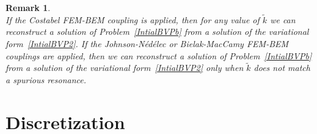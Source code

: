 \documentclass[a4paper,11pt]{article}
\newtheorem{rem}[defn]{Remark}
\begin{document}
\begin{rem}\quad\\
  If the Costabel FEM-BEM coupling is applied, then for any value of
  $\tilde{k}$ we can reconstruct a solution of Problem~\eqref{IntialBVPb}
  from a solution of the variational form~\eqref{IntialBVP2}.  If the
  Johnson-Nédélec or Bielak-MacCamy FEM-BEM couplings are applied, then we
  can reconstruct a solution of Problem~\eqref{IntialBVPb} from a solution
  of the variational form~\eqref{IntialBVP2} only when \(\tilde{k}\) does
  not match a spurious resonance.
\end{rem}


\section{Discretization}
\label{sec:discr}
\end{document}

